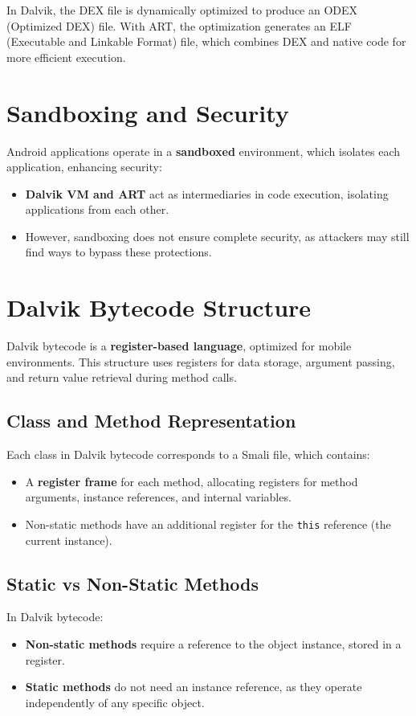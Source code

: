 \documentclass{article}
\begin{document}
In Dalvik, the DEX file is dynamically optimized to produce an ODEX (Optimized DEX) file. With ART, the optimization generates an ELF (Executable and Linkable Format) file, which combines DEX and native code for more efficient execution.

\section{Sandboxing and Security}
Android applications operate in a \textbf{sandboxed} environment, which isolates each application, enhancing security:
\begin{itemize}
    \item \textbf{Dalvik VM and ART} act as intermediaries in code execution, isolating applications from each other.
    \item However, sandboxing does not ensure complete security, as attackers may still find ways to bypass these protections.
\end{itemize}

\section{Dalvik Bytecode Structure}
Dalvik bytecode is a \textbf{register-based language}, optimized for mobile environments. This structure uses registers for data storage, argument passing, and return value retrieval during method calls.

\subsection{Class and Method Representation}
Each class in Dalvik bytecode corresponds to a Smali file, which contains:
\begin{itemize}
    \item A \textbf{register frame} for each method, allocating registers for method arguments, instance references, and internal variables.
    \item Non-static methods have an additional register for the \texttt{this} reference (the current instance).
\end{itemize}

\subsection{Static vs Non-Static Methods}
In Dalvik bytecode:
\begin{itemize}
    \item \textbf{Non-static methods} require a reference to the object instance, stored in a register.
    \item \textbf{Static methods} do not need an instance reference, as they operate independently of any specific object.
\end{itemize}
\end{document}
